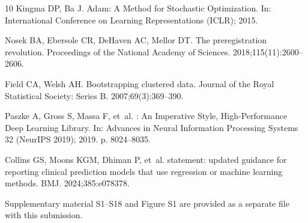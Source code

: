 \documentclass[VANCOUVER,Times1COL]{WileyNJDv5}
\begin{document}
\begin{thebibliography}{10}
Kingma DP, Ba J.
\newblock Adam: A Method for Stochastic Optimization.
\newblock In: International Conference on Learning Representations (ICLR);
  2015.

Nosek BA, Ebersole CR, DeHaven AC, Mellor DT.
\newblock The preregistration revolution.
\newblock Proceedings of the National Academy of Sciences.
  2018;115(11):2600--2606.

Field CA, Welsh AH.
\newblock Bootstrapping clustered data.
\newblock Journal of the Royal Statistical Society: Series B.
  2007;69(3):369--390.

Paszke A, Gross S, Massa F, et~al.
: An Imperative Style, High-Performance Deep Learning
  Library.
\newblock In: Advances in Neural Information Processing Systems 32 (NeurIPS
  2019); 2019. p. 8024--8035.

Collins GS, Moons KGM, Dhiman P, et~al.
 statement: updated guidance for reporting clinical
  prediction models that use regression or machine learning methods.
\newblock BMJ. 2024;385:e078378.

\end{thebibliography}


Supplementary material S1--S18 and Figure S1 are provided as a separate file with this submission.
\end{document}
